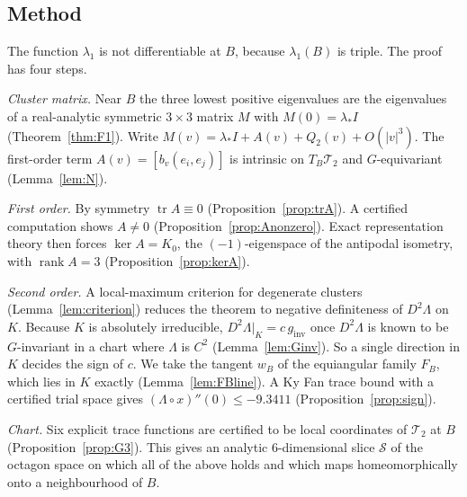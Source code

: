\documentclass[11pt]{amsart}
\theoremstyle{definition}
\theoremstyle{remark}
\newcommand{\Teich}{\mathcal{T}_2}
\newcommand{\Sl}{\mathcal{S}}
\newcommand{\tr}{\operatorname{tr}}
\newcommand{\rank}{\operatorname{rank}}
\newcommand{\ls}{\lambda_*}
\newcommand{\gin}{g_{\mathrm{inv}}}
\newcommand{\wB}{w_B}
\newcommand{\FB}{F_B}
\begin{document}
\subsection{Method}
The function $\lambda_1$ is not differentiable at $B$, because $\lambda_1(B)$ is triple. The
proof has four steps.

\emph{Cluster matrix.} Near $B$ the three lowest positive eigenvalues are the eigenvalues of a
real-analytic symmetric $3\times3$ matrix $M$ with $M(0)=\ls I$ (Theorem~\ref{thm:F1}). Write
$M(v)=\ls I+A(v)+Q_2(v)+O(|v|^3)$. The first-order term
$A(v)=[b_v(e_i,e_j)]$ is intrinsic on $T_B\Teich$ and $G$-equivariant (Lemma~\ref{lem:N}).

\emph{First order.} By symmetry $\tr A\equiv0$ (Proposition~\ref{prop:trA}). A certified
computation shows $A\ne0$ (Proposition~\ref{prop:Anonzero}). Exact representation theory then
forces $\ker A=K_0$, the $(-1)$-eigenspace of the antipodal isometry, with $\rank A=3$
(Proposition~\ref{prop:kerA}).

\emph{Second order.} A local-maximum criterion for degenerate clusters
(Lemma~\ref{lem:criterion}) reduces the theorem to negative definiteness of $D^2\Lambda$ on
$K$. Because $K$ is absolutely irreducible, $D^2\Lambda|_K=c\,\gin$ once $D^2\Lambda$ is known to
be $G$-invariant in a chart where $\Lambda$ is $C^2$ (Lemma~\ref{lem:Ginv}). So a single
direction in $K$ decides the sign of $c$. We take the tangent $\wB$ of the equiangular family
$\FB$, which lies in $K$ exactly (Lemma~\ref{lem:FBline}). A Ky Fan trace bound with a certified
trial space gives $(\Lambda\circ x)''(0)\le -9.3411$ (Proposition~\ref{prop:sign}).

\emph{Chart.} Six explicit trace functions are certified to be local coordinates of $\Teich$
at $B$ (Proposition~\ref{prop:G3}). This gives an analytic $6$-dimensional slice $\Sl$ of the
octagon space on which all of the above holds and which maps homeomorphically onto a
neighbourhood of $B$.
\end{document}
